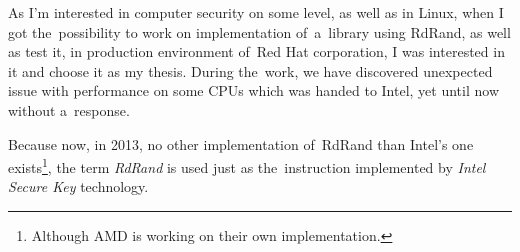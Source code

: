 As I'm interested in computer security on some level, as well as in Linux, when I got the~possibility to work on implementation of~a~library using RdRand, as well as test it, in production environment of~Red Hat corporation, I was interested in it and choose it as my thesis. During the~work, we have discovered unexpected issue with performance on some CPUs which was handed to Intel, yet until now without a~response.

Because now, in 2013, no other implementation of~RdRand than Intel's one exists\footnote{Although AMD is working on their own implementation.},%
the term {\em RdRand} is used just as the~instruction implemented by {\em Intel Secure Key} technology.



